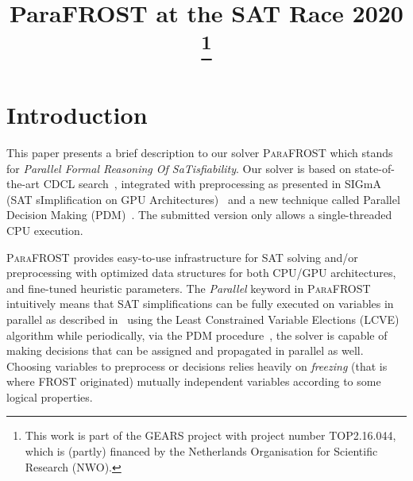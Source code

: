 \documentclass[conference]{IEEEtran}
\newcommand{\parafrost}{\textsc{ParaFROST}\xspace}
\begin{document}
\title{ParaFROST at the SAT Race 2020
\thanks{This work is part of the GEARS project with project number TOP2.16.044, which is (partly) financed by the Netherlands Organisation for Scientific Research (NWO).}
}

\author{
}

\maketitle

\section{Introduction}
This paper presents a brief description to our solver \parafrost{} which stands for \emph{Parallel Formal Reasoning Of SaTisfiability}. Our solver is based on state-of-the-art CDCL search~\cite{grasp,minisat,glucose}, integrated with preprocessing as presented in SIGmA (SAT sImplification on GPU Architectures)~\cite{sigmaTacas,sigmaIfm} and a new technique called Parallel Decision Making (PDM)~\cite{pdcl}. The submitted version only allows a single-threaded CPU execution.

\parafrost provides easy-to-use infrastructure for SAT solving and/or preprocessing with optimized data structures for both CPU/GPU architectures, and fine-tuned heuristic parameters. The \emph{Parallel} keyword in \parafrost intuitively means that SAT simplifications can be fully executed on variables in parallel as described in~\cite{sigmaTacas} using the Least Constrained Variable Elections (LCVE) algorithm while periodically, via the PDM procedure~\cite{pdcl}, the solver is capable of making decisions that can be assigned and propagated in parallel as well. Choosing variables to preprocess or decisions relies heavily on \emph{freezing} (that is where FROST originated) mutually independent variables according to some logical properties.  


\end{document}
